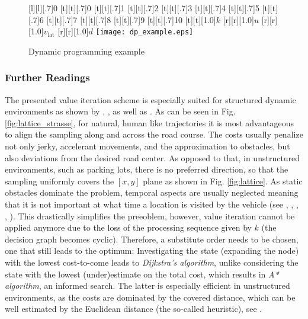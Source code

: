 \begin{figure}[h]
	[l][.7]{0}
	[t][.7]{0}
	[t][.7]{1}
	[t][.7]{2}
	[t][.7]{3}
	[t][.7]{4}
	[t][.7]{5}
	[t][.7]{6}
	[t][.7]{7}
	[t][.7]{8}
	[t][.7]{9}
	[t][.7]{10}
	[t][1.0]{$k$}
	[r][1.0]{$u$}
	[r][1.0]{$v_\text{lat}$}
	[r][1.0]{$d$}
	\centering
	\centering
  	\texttt{[image: dp\_example.eps]}
	\caption[Dynamic programming example]{Dynamic programming example}
	\label{fig:dynamische_programmierung_veranschaulichung}
\end{figure} 


\subsubsection{Further Readings}\label{S:57.3.3.4}
The presented value iteration scheme is especially suited for structured dynamic environments as shown by \cite{zieg09spatemp},%
\cite{McNaughton2011diss},%
as well as \cite{Gu2012}.%
As can be seen in Fig. \ref{fig:lattice_strasse}, for natural, human like trajectories it is most advantageous to align the sampling along and across the road course. The costs usually penalize not only jerky, accelerant movements, and the approximation to obstacles, but also deviations from the desired road center. 
As opposed to that, in unstructured environments, such as parking lots, there is no preferred direction, so that the sampling uniformly covers the $[x,y]$ plane as shown in  Fig. \ref{fig:lattice}. 
As static obstacles dominate the problem, temporal aspects are usually neglected meaning that it is not important at what time a location is visited by the vehicle (see \cite{montemerlo2008junior},%
\cite{zieglerIV08},%
\cite{pivtoraiko2009differentially},%
\cite{likhachev2009planning},%
\cite{dolgov2010path}).%
This drastically simplifies the preeoblem, however, value iteration cannot be applied anymore due to the loss of the processing sequence given by $k$ (the decision graph becomes cyclic). Therefore, a substitute order needs to be chosen, one that still leads to the optimum: Investigating the state (expanding the node) with the lowest cost-to-come leads to \emph{Dijkstra's algorithm}, unlike considering the state with the lowest (under)estimate on the total cost, which results in \emph{A* algorithm}, an informed search.
 The latter is especially efficient in unstructured environments, as the costs are dominated by the covered distance, which can be well estimated by the Euclidean distance (the so-called heuristic), see \cite{bertsekas2007}.%


